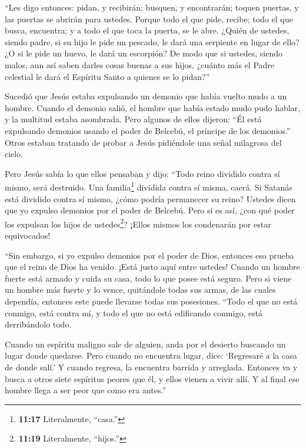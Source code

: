  ``Les digo entonces: pidan, y recibirán; busquen, y
encontrarán; toquen puertas, y las puertas se abrirán para ustedes.
 Porque todo el que pide, recibe; todo el que busca,
encuentra; y a todo el que toca la puerta, se le abre. 
¿Quién de ustedes, siendo padre, si su hijo le pide un pescado, le dará
una serpiente en lugar de ello?  ¿O si le pide un huevo, le
dará un escorpión?  De modo que si ustedes, siendo malos,
aun así saben darles cosas buenas a sus hijos, ¿cuánto más el Padre
celestial le dará el Espíritu Santo a quienes se lo pidan?''

 Sucedió que Jesús estaba expulsando un demonio que había
vuelto mudo a un hombre. Cuando el demonio salió, el hombre que había
estado mudo pudo hablar, y la multitud estaba asombrada. 
Pero algunos de ellos dijeron: ``Él está expulsando demonios usando el
poder de Belcebú, el príncipe de los demonios.''  Otros
estaban tratando de probar a Jesús pidiéndole una señal milagrosa del
cielo.

 Pero Jesús sabía lo que ellos pensaban y dijo: ``Todo
reino dividido contra sí mismo, será destruido. Una familia\footnote{\textbf{11:17}
  Literalmente, ``casa.''} dividida contra sí misma, caerá.
 Si Satanás está dividido contra sí mismo, ¿cómo podría
permanecer su reino? Ustedes dicen que yo expulso demonios por el poder
de Belcebú.  Pero si es así, ¿con qué poder los expulsan
los hijos de ustedes\footnote{\textbf{11:19} Literalmente, ``hijos.''}?
¡Ellos mismos los condenarán por estar equivocados!

 ``Sin embargo, si yo expulso demonios por el poder de
Dios, entonces eso prueba que el reino de Dios ha venido. ¡Está justo
aquí entre ustedes!  Cuando un hombre fuerte está armado y
cuida su casa, todo lo que posee está seguro.  Pero si
viene un hombre más fuerte y lo vence, quitándole todas sus armas, de
las cuales dependía, entonces este puede llevarse todas sus posesiones.
 ``Todo el que no está conmigo, está contra mí, y todo el
que no está edificando conmigo, está derribándolo todo.

 Cuando un espíritu maligno sale de alguien, anda por el
desierto buscando un lugar donde quedarse. Pero cuando no encuentra
lugar, dice: `Regresaré a la casa de donde salí.'  Y cuando
regresa, la encuentra barrida y arreglada.  Entonces va y
busca a otros siete espíritus peores que él, y ellos vienen a vivir
allí. Y al final ese hombre llega a ser peor que como era antes.''

